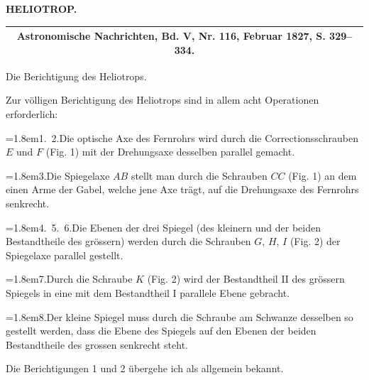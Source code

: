 \par\clearpage
\noindent{}\hfill{\small\textbf{HELIOTROP.}}\hfill\null\par
\vspace*{4.4cm}
\begin{center}
\begin{tabular}{c}\hline
\small\textbf{Astronomische Nachrichten, Bd. V, Nr. 116, Februar 1827, S. 329--334.}\\\hline
\end{tabular}\par\bigskip
{\large Die Berichtigung des Heliotrops.}
\end{center}
\par\noindent\hspace*{\parindent}Zur völligen Berichtigung des Heliotrops sind in allem acht Operationen erforderlich:
\par\noindent\hangindent=1.8em\hspace*{1em}1.\ 2.\quad Die optische Axe des Fernrohrs wird durch die Correctionsschrauben $E$ und $F$ (Fig. 1) mit der Drehungsaxe desselben parallel gemacht.
\par\noindent\hangindent=1.8em\hspace*{1em}3.\quad Die Spiegelaxe $AB$ stellt man durch die Schrauben $CC$ (Fig. 1) an dem einen Arme der Gabel, welche jene Axe trägt, auf die Drehungsaxe des Fernrohrs senkrecht.
\par\noindent\hangindent=1.8em\hspace*{1em}4.\ 5.\ 6.\quad Die Ebenen der drei Spiegel (des kleinern und der beiden Bestandtheile des grössern) werden durch die Schrauben $G$, $H$, $I$ (Fig. 2) der Spiegelaxe parallel gestellt.
\par\noindent\hangindent=1.8em\hspace*{1em}7.\quad Durch die Schraube $K$ (Fig. 2) wird der Bestandtheil II des grössern Spiegels in eine mit dem Bestandtheil I parallele Ebene gebracht.
\par\noindent\hangindent=1.8em\hspace*{1em}8.\quad Der kleine Spiegel muss durch die Schraube am Schwanze desselben so gestellt werden, dass die Ebene des Spiegels auf den Ebenen der beiden Bestandtheile des grossen senkrecht steht.
\par\noindent\hspace*{\parindent}Die Berichtigungen 1 und 2 übergehe ich als allgemein bekannt.


